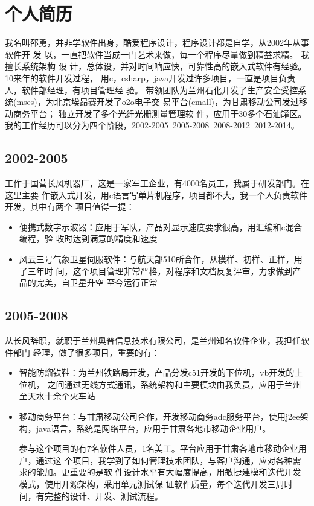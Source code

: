 

\section{个人简历}

我名叫邵勇，并非学软件出身，酷爱程序设计，程序设计都是自学，从2002年从事软件开
发 以，一直把软件当成一门艺术来做，毎一个程序尽量做到精益求精。 我擅长系统架构
设 计，总体设，并对时间响应快，可靠性高的嵌入式软件有经验。10来年的软件开发过程，
用c，csharp，java开发过许多项目，一直是项目负责人，软件部经理，有项目管理经
验。 带领团队为兰州石化开发了生产安全受控系统(mses)，为北京埃昂赛开发了o2o电子交
易平台(cmall)，为甘肃移动公司发过移动商务平台； 独立开发了多个光纤光栅测量管理软
件，应用于30多个石油罐区。我的工作经历可以分为四个阶段，2002-2005\ 2005-2008\
2008-2012\ 2012-2014。

\subsection{2002-2005}

工作于国营长风机器厂，这是一家军工企业，有4000名员工，我属于研发部门。在这里主要
作嵌入式开发，用c语言写单片机程序，项目都不大，我一个人负责软件开发，其中有两个
项目值得一提：
\begin{itemize}
\item 便携式数字示波器：应用于军队，产品对显示速度要求很高，用汇编和c混合编程，验
  收时达到满意的精度和速度
\item 风云三号气象卫星伺服软件：与航天部510所合作，从模样、初样、正样，用了三年时
  间，这个项目管理非常严格，对程序和文档反复评审，力求做到产品的完美，自卫星升空
  至今运行正常
\end{itemize}

\subsection{2005-2008}

从长风辞职，就职于兰州奥普信息技术有限公司，是兰州知名软件企业，我担任软件部门
经理，做了很多项目，重要的有：
\begin{itemize}
\item 智能防熘铁鞋：为兰州铁路局开发，产品分发c51开发的下位机，vb开发的上位机，
  之间通过无线方式通讯，系统架构和主要模块由我负责，应用于兰州至天水十余个火车站
\item 移动商务平台：与甘肃移动公司合作，开发移动商务adc服务平台，使用j2ee架
  构，java语言，系统是网络平台，应用于甘肃各地市移动企业用户。

  参与这个项目的有7名软件人员，1名美工。平台应用于甘肃各地市移动企业用户，通过这
  个项目，我学到了如何管理技术团队，与客户沟通，应对各种需求的能加。更重要的是软
  件设计水平有大幅度提高，用敏捷建模和迭代开发模式，使用开源架构，采用单元测试保
  证软件质量，毎个迭代开发三周时间，有完整的设计、开发、测试流程。
\end{itemize}


